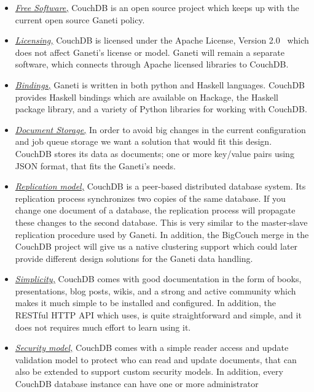 \begin{itemize}
  \item \underline{\emph{Free Software,}} CouchDB is an open source project
    which keeps up with the current open source Ganeti policy.
  \item \underline{\emph{Licensing,}} CouchDB is licensed under the Apache
    License, Version 2.0~
    which does not affect Ganeti's license or model. Ganeti will remain a
    separate software, which connects through Apache licensed libraries to
    CouchDB.
  \item \underline{\emph{Bindings,}} Ganeti is written in both python and
    Haskell languages. CouchDB provides Haskell bindings which are available on
    Hackage, the Haskell package library, and a variety of Python libraries for
    working with CouchDB.
  \item \underline{\emph{Document Storage,}} In order to avoid big changes in
    the current configuration and job queue storage we want a solution that
    would fit this design. CouchDB stores its data as documents; one or more
    key/value pairs using JSON format, that fits the Ganeti's needs.
  \item \underline{\emph{Replication model,}} CouchDB is a peer-based distributed
    database system. Its replication process synchronizes two copies of the same
    database. If you change one document of a database, the replication process
    will propagate these changes to the second database.
    This is very similar to the master-slave
    replication procedure used by Ganeti. In addition, the BigCouch merge in the
    CouchDB project will give us a native clustering support which could later
    provide different design solutions for the Ganeti data handling.
  \item \underline{\emph{Simplicity,}} CouchDB comes with good documentation in
    the form of books, presentations, blog posts, wikis, and a strong and active
    community which makes it much simple to be installed and configured. In
    addition, the RESTful HTTP API which uses, is quite straightforward and
    simple, and it does not requires much effort to learn using it.
  \item \underline{\emph{Security model,}} CouchDB comes with a simple reader
    access and update validation model to protect who can read and update
    documents, that can also be extended to support custom security models. In
    addition, every CouchDB database instance can have one or more administrator

\end{itemize}
